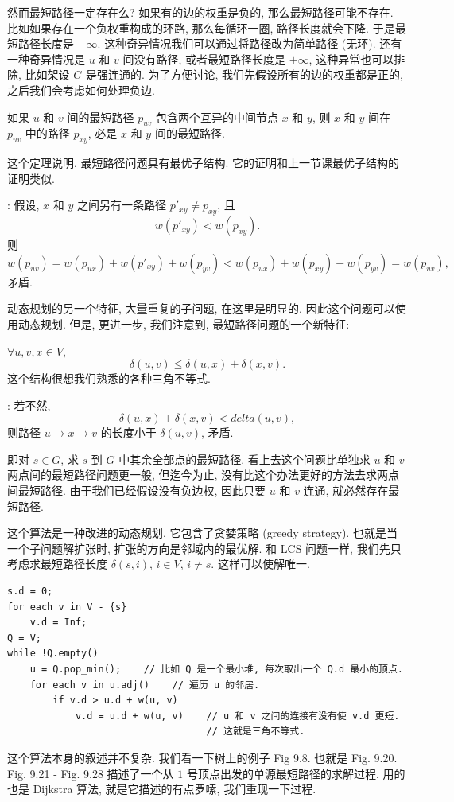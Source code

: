 \documentclass[a4paper]{ctexart}
\theoremstyle{definition}
\theoremstyle{definition}
\begin{document}
然而最短路径一定存在么? 如果有的边的权重是负的, 那么最短路径可能不存在.
比如如果存在一个负权重构成的环路, 那么每循环一圈, 路径长度就会下降.
于是最短路径长度是 $-\infty$. 这种奇异情况我们可以通过将路径改为简单路径 (无环).
还有一种奇异情况是 $u$ 和 $v$ 间没有路径, 或者最短路径长度是 $+\infty$,
这种异常也可以排除, 比如架设 $G$ 是强连通的. 为了方便讨论,
我们先假设所有的边的权重都是正的, 之后我们会考虑如何处理负边.

 如果 $u$ 和 $v$ 间的最短路径 $p_{uv}$ 包含两个互异的中间节点
$x$ 和 $y$, 则 $x$ 和 $y$ 间在 $p_{uv}$ 中的路径 $p_{xy}$, 必是 $x$ 和 $y$ 间的最短路径.

这个定理说明, 最短路径问题具有最优子结构. 它的证明和上一节课最优子结构的证明类似.

: 假设, $x$ 和 $y$ 之间另有一条路径 $p'_{xy} \neq p_{xy}$, 且
$$
w(p'_{xy}) < w(p_{xy}).
$$
则
$$
w(p_{uv}) = w(p_{ux}) + w(p'_{xy}) + w(p_{yv}) < w(p_{ux}) + w(p_{xy}) + w(p_{yv})
= w(p_{uv}),
$$
矛盾. 

动态规划的另一个特征, 大量重复的子问题, 在这里是明显的. 因此这个问题可以使用动态规划.
但是, 更进一步, 我们注意到, 最短路径问题的一个新特征:

 $\forall u, v, x \in V$,
$$
\delta(u, v) \leq \delta(u, x) + \delta(x, v).
$$
这个结构很想我们熟悉的各种三角不等式.

: 若不然,
$$
\delta(u, x) + \delta(x, v) < delta(u, v),
$$
则路径 $u \to x \to v$ 的长度小于 $\delta(u, v)$, 矛盾. 


即对 $s \in G$, 求 $s$ 到 $G$ 中其余全部点的最短路径. 看上去这个问题比单独求
$u$ 和 $v$ 两点间的最短路径问题更一般, 但迄今为止, 没有比这个办法更好的方法去求两点间最短路径.
由于我们已经假设没有负边权, 因此只要 $u$ 和 $v$ 连通, 就必然存在最短路径.

这个算法是一种改进的动态规划, 它包含了贪婪策略 (greedy strategy). 也就是当一个子问题解扩张时,
扩张的方向是邻域内的最优解. 和 LCS 问题一样, 我们先只考虑求最短路径长度 $\delta(s, i)$,
$i \in V$, $i \neq s$. 这样可以使解唯一.

\begin{verbatim}
s.d = 0;
for each v in V - {s}
    v.d = Inf;
Q = V;
while !Q.empty()
    u = Q.pop_min();    // 比如 Q 是一个最小堆, 每次取出一个 Q.d 最小的顶点.
    for each v in u.adj()    // 遍历 u 的邻居.
        if v.d > u.d + w(u, v)    
            v.d = u.d + w(u, v)    // u 和 v 之间的连接有没有使 v.d 更短.
                                   // 这就是三角不等式.
\end{verbatim}
这个算法本身的叙述并不复杂. 我们看一下树上的例子 Fig 9.8. 也就是 Fig. 9.20.
Fig. 9.21 - Fig. 9.28 描述了一个从 $1$ 号顶点出发的单源最短路径的求解过程.
用的也是 Dijkstra 算法, 就是它描述的有点罗嗦, 我们重现一下过程.
\end{document}
